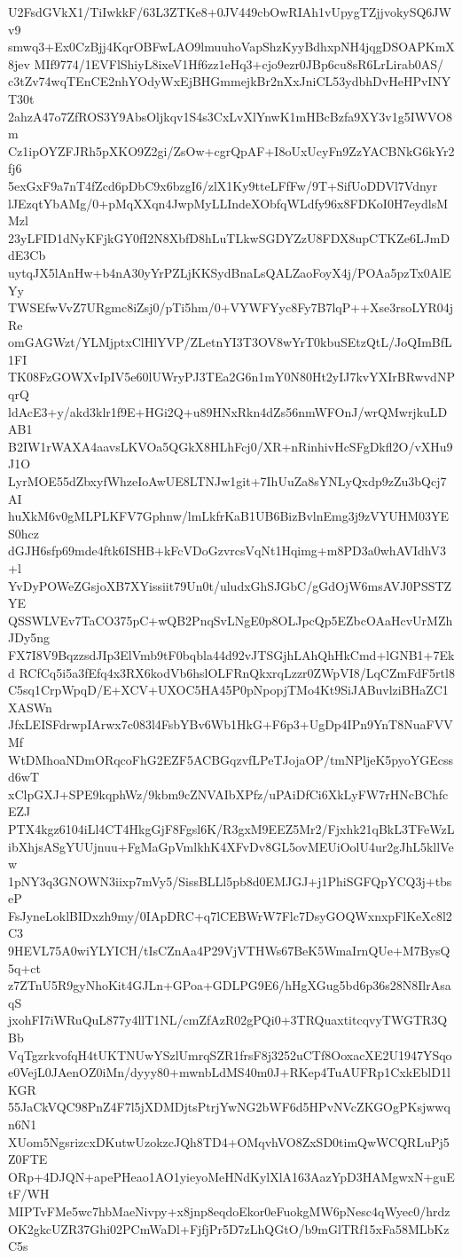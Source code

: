 U2FsdGVkX1/TiIwkkF/63L3ZTKe8+0JV449cbOwRIAh1vUpygTZjjvokySQ6JWv9
smwq3+Ex0CzBjj4KqrOBFwLAO9lmuuhoVapShzKyyBdhxpNH4jqgDSOAPKmX8jev
MIf9774/1EVFlShiyL8ixeV1Hf6zz1eHq3+cjo9ezr0JBp6cu8sR6LrLirab0AS/
c3tZv74wqTEnCE2nhYOdyWxEjBHGmmejkBr2nXxJniCL53ydbhDvHeHPvINYT30t
2ahzA47o7ZfROS3Y9AbsOljkqv1S4s3CxLvXlYnwK1mHBcBzfa9XY3v1g5IWVO8m
Cz1ipOYZFJRh5pXKO9Z2gi/ZsOw+cgrQpAF+I8oUxUcyFn9ZzYACBNkG6kYr2fj6
5exGxF9a7nT4fZcd6pDbC9x6bzgI6/zlX1Ky9tteLFfFw/9T+SifUoDDVl7Vdnyr
lJEzqtYbAMg/0+pMqXXqn4JwpMyLLIndeXObfqWLdfy96x8FDKoI0H7eydlsMMzl
23yLFID1dNyKFjkGY0fI2N8XbfD8hLuTLkwSGDYZzU8FDX8upCTKZe6LJmDdE3Cb
uytqJX5lAnHw+b4nA30yYrPZLjKKSydBnaLsQALZaoFoyX4j/POAa5pzTx0AlEYy
TWSEfwVvZ7URgmc8iZsj0/pTi5hm/0+VYWFYyc8Fy7B7lqP++Xse3rsoLYR04jRe
omGAGWzt/YLMjptxClHlYVP/ZLetnYI3T3OV8wYrT0kbuSEtzQtL/JoQImBfL1FI
TK08FzGOWXvIpIV5e60lUWryPJ3TEa2G6n1mY0N80Ht2yIJ7kvYXIrBRwvdNPqrQ
ldAcE3+y/akd3klr1f9E+HGi2Q+u89HNxRkn4dZs56nmWFOnJ/wrQMwrjkuLDAB1
B2IW1rWAXA4aavsLKVOa5QGkX8HLhFcj0/XR+nRinhivHcSFgDkfl2O/vXHu9J1O
LyrMOE55dZbxyfWhzeIoAwUE8LTNJw1git+7IhUuZa8sYNLyQxdp9zZu3bQcj7AI
huXkM6v0gMLPLKFV7Gphnw/lmLkfrKaB1UB6BizBvlnEmg3j9zVYUHM03YES0hcz
dGJH6sfp69mde4ftk6ISHB+kFcVDoGzvrcsVqNt1Hqimg+m8PD3a0whAVIdhV3+l
YvDyPOWeZGsjoXB7XYissiit79Un0t/uludxGhSJGbC/gGdOjW6msAVJ0PSSTZYE
QSSWLVEv7TaCO375pC+wQB2PnqSvLNgE0p8OLJpcQp5EZbcOAaHcvUrMZhJDy5ng
FX7I8V9BqzzsdJIp3ElVmb9tF0bqbla44d92vJTSGjhLAhQhHkCmd+lGNB1+7Ekd
RCfCq5i5a3fEfq4x3RX6kodVb6hslOLFRnQkxrqLzzr0ZWpVI8/LqCZmFdF5rtl8
C5sq1CrpWpqD/E+XCV+UXOC5HA45P0pNpopjTMo4Kt9SiJABuvlziBHaZC1XASWn
JfxLEISFdrwpIArwx7c083l4FsbYBv6Wb1HkG+F6p3+UgDp4IPn9YnT8NuaFVVMf
WtDMhoaNDmORqcoFhG2EZF5ACBGqzvfLPeTJojaOP/tmNPljeK5pyoYGEcssd6wT
xClpGXJ+SPE9kqphWz/9kbm9cZNVAIbXPfz/uPAiDfCi6XkLyFW7rHNcBChfcEZJ
PTX4kgz6104iLl4CT4HkgGjF8Fgsl6K/R3gxM9EEZ5Mr2/Fjxhk21qBkL3TFeWzL
ibXhjsASgYUUjnuu+FgMaGpVmlkhK4XFvDv8GL5ovMEUiOolU4ur2gJhL5kllVew
1pNY3q3GNOWN3iixp7mVy5/SissBLLl5pb8d0EMJGJ+j1PhiSGFQpYCQ3j+tbseP
FsJyneLoklBIDxzh9my/0IApDRC+q7lCEBWrW7Flc7DsyGOQWxnxpFlKeXc8l2C3
9HEVL75A0wiYLYICH/tIsCZnAa4P29VjVTHWs67BeK5WmaIrnQUe+M7BysQ5q+ct
z7ZTnU5R9gyNhoKit4GJLn+GPoa+GDLPG9E6/hHgXGug5bd6p36s28N8IlrAsaqS
jxohFI7iWRuQuL877y4llT1NL/cmZfAzR02gPQi0+3TRQuaxtitcqvyTWGTR3QBb
VqTgzrkvofqH4tUKTNUwYSzlUmrqSZR1frsF8j3252uCTf8OoxacXE2U1947YSqo
e0VejL0JAenOZ0iMn/dyyy80+mwnbLdMS40m0J+RKep4TuAUFRp1CxkEblD1lKGR
55JaCkVQC98PnZ4F7l5jXDMDjtsPtrjYwNG2bWF6d5HPvNVcZKGOgPKsjwwqn6N1
XUom5NgsrizcxDKutwUzokzcJQh8TD4+OMqvhVO8ZxSD0timQwWCQRLuPj5Z0FTE
ORp+4DJQN+apePHeao1AO1yieyoMeHNdKylXlA163AazYpD3HAMgwxN+guEtF/WH
MIPTvFMe5wc7hbMaeNivpy+x8jnp8eqdoEkor0eFuokgMW6pNesc4qWyec0/hrdz
OK2gkcUZR37Ghi02PCmWaDl+FjfjPr5D7zLhQGtO/b9mGlTRf15xFa58MLbKzC5s

